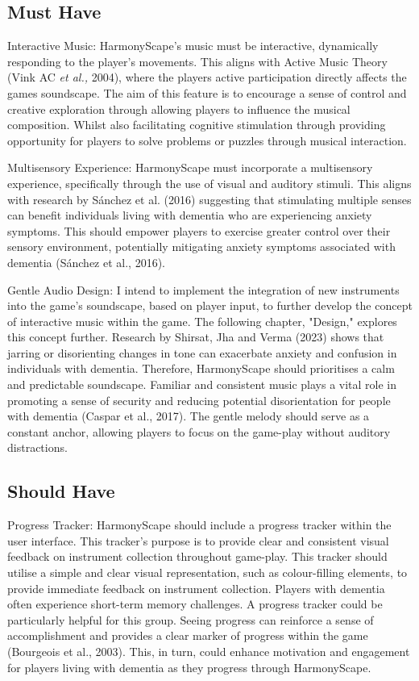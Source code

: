 \documentclass{l4proj}
\begin{document}
\subsection{Must Have}
Interactive Music: HarmonyScape's music must be interactive, dynamically responding to the player's movements. This aligns with Active Music Theory (Vink AC \emph{et al.,} 2004), where the players active participation directly affects the games soundscape. The aim of this feature is to encourage a sense of control and creative exploration through allowing players to influence the musical composition. Whilst also facilitating cognitive stimulation through providing opportunity for players to solve problems or puzzles through musical interaction.

Multisensory Experience: HarmonyScape must incorporate a multisensory experience, specifically through the use of visual and auditory stimuli. This aligns with research by Sánchez et al. (2016) suggesting that stimulating multiple senses can benefit individuals living with dementia who are experiencing anxiety symptoms. This should empower players to exercise greater control over their sensory environment, potentially mitigating anxiety symptoms associated with dementia (Sánchez et al., 2016).

Gentle Audio Design: I intend to implement the integration of new instruments into the game's soundscape, based on player input, to further develop the concept of interactive music within the game. The following chapter, "Design," explores this concept further. Research by Shirsat, Jha and Verma (2023) shows that jarring or disorienting changes in tone can exacerbate anxiety and confusion in individuals with dementia. Therefore, HarmonyScape should prioritises a calm and predictable soundscape. Familiar and consistent music plays a vital role in promoting a sense of security and reducing potential disorientation for people with dementia (Caspar et al., 2017). The gentle melody should serve as a constant anchor, allowing players to focus on the game-play without auditory distractions.

\subsection{Should Have}
Progress Tracker: HarmonyScape should include a progress tracker within the user interface. This tracker's purpose is to provide clear and consistent visual feedback on instrument collection throughout game-play. This tracker should utilise a simple and clear visual representation, such as colour-filling elements, to provide immediate feedback on instrument collection. Players with dementia often experience short-term memory challenges. A progress tracker could be particularly helpful for this group. Seeing progress can reinforce a sense of accomplishment and provides a clear marker of progress within the game (Bourgeois et al., 2003). This, in turn, could enhance motivation and engagement for players living with dementia as they progress through HarmonyScape.
\end{document}
